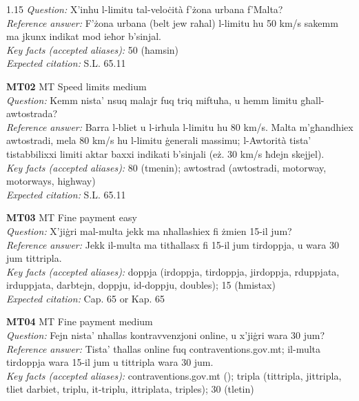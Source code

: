 \begin{spacing}{1.15}
\textit{Question:} X'inhu l-limitu tal-veloċità f'żona urbana f'Malta? \\
\textit{Reference answer:} F'żona urbana (belt jew raħal) l-limitu hu 50 km/s sakemm ma jkunx indikat mod ieħor b'sinjal. \\
\textit{Key facts (accepted aliases):} 50 (ħamsin) \\
\textit{Expected citation:} S.L. 65.11
\par\vspace{5pt}
\noindent\textbf{MT02} \quad MT \quad Speed limits \quad medium \\
\textit{Question:} Kemm nista' nsuq malajr fuq triq miftuħa, u hemm limitu għall-awtostrada? \\
\textit{Reference answer:} Barra l-bliet u l-irħula l-limitu hu 80 km/s. Malta m'għandhiex awtostradi, mela 80 km/s hu l-limitu ġenerali massimu; l-Awtorità tista' tistabbilixxi limiti aktar baxxi indikati b'sinjali (eż. 30 km/s ħdejn skejjel). \\
\textit{Key facts (accepted aliases):} 80 (tmenin); awtostrad (awtostradi, motorway, motorways, highway) \\
\textit{Expected citation:} S.L. 65.11
\par\vspace{5pt}
\noindent\textbf{MT03} \quad MT \quad Fine payment \quad easy \\
\textit{Question:} X'jiġri mal-multa jekk ma nħallashiex fi żmien 15-il jum? \\
\textit{Reference answer:} Jekk il-multa ma titħallasx fi 15-il jum tirdoppja, u wara 30 jum tittripla. \\
\textit{Key facts (accepted aliases):} doppja (irdoppja, tirdoppja, jirdoppja, rduppjata, irduppjata, darbtejn, doppju, id-doppju, doubles); 15 (ħmistax) \\
\textit{Expected citation:} Cap. 65 or Kap. 65
\par\vspace{5pt}
\noindent\textbf{MT04} \quad MT \quad Fine payment \quad medium \\
\textit{Question:} Fejn nista' nħallas kontravvenzjoni online, u x'jiġri wara 30 jum? \\
\textit{Reference answer:} Tista' tħallas online fuq contraventions.gov.mt; il-multa tirdoppja wara 15-il jum u tittripla wara 30 jum. \\
\textit{Key facts (accepted aliases):} contraventions.gov.mt (); tripla (tittripla, jittripla, tliet darbiet, triplu, it-triplu, ittriplata, triples); 30 (tletin) \\

\end{spacing}
